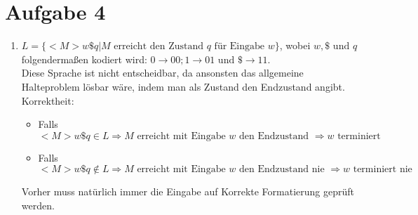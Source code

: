 \documentclass[a4paper,11pt]{scrartcl}
\begin{document}
	

	
	
	\section*{Aufgabe 4}
	\begin{enumerate}[label=\alph*)]
	\item 	$L = \{<M>w\$q \vert M \text{ erreicht den Zustand } q \text{ für Eingabe } w\}$, wobei $w, \$ \text{ und } q$ folgendermaßen kodiert wird: $0 \rightarrow 00; 1 \rightarrow 01 \text{ und } \$ \rightarrow 11$.\\
			Diese Sprache ist nicht entscheidbar, da ansonsten das allgemeine Halteproblem lösbar wäre, indem man als Zustand den Endzustand angibt.\\
			Korrektheit: 
			\begin{itemize}
			\item Falls $<M>w\$q \in L \Rightarrow M \text{ erreicht mit Eingabe } w \text{ den Endzustand } \Rightarrow w \text{ terminiert}$
			\item Falls $<M>w\$q \not\in L \Rightarrow M \text{ erreicht mit Eingabe } w \text{ den Endzustand nie } \Rightarrow w \text{ terminiert nie}$
			\end{itemize}
			Vorher muss natürlich immer die Eingabe auf Korrekte Formatierung geprüft werden.
			

\end{enumerate}
\end{document}
